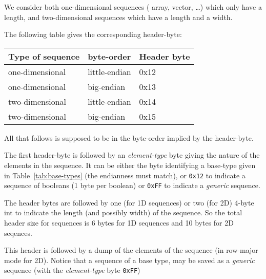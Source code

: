 \documentclass[11pt]{book}
\begin{document}
We consider both one-dimensional sequences ( array, vector, \ldots) which only have a length,
and two-dimensional sequences which have a length and a width.

The following table gives the corresponding header-byte:

\begin{tabular}{|lll|}
Type of sequence & byte-order    & Header byte \\ \hline
one-dimensional  & little-endian & 0x12        \\ 
one-dimensional  & big-endian    & 0x13        \\ 
two-dimensional  & little-endian & 0x14        \\ 
two-dimensional  & big-endian    & 0x15        \\ \hline
\end{tabular}

All that follows is supposed to be in the byte-order implied by the header-byte.

The first header-byte is followed by an {\em element-type} byte giving the nature
of the elements in the sequence.  It can be either the byte identifying a
base-type given in Table~\ref{tab:base-types} (the endianness must match),
or {\tt 0x12} to indicate a sequence of booleans (1 byte per boolean) 
or {\tt 0xFF} to indicate a {\em generic} sequence.

The header bytes are followed by one (for 1D sequences) or two (for 2D)
4-byte int to indicate the length (and possibly width) of the sequence.
So the total header size for sequences is 6 bytes for 1D sequences and 10
bytes for 2D seqences.

This header is followed by a dump of the elements of the sequence (in
row-major mode for 2D).  Notice that a sequence of a base type, may be
saved as a {\em generic} sequence (with the {\em element-type} byte {\tt 0xFF})
\end{document}
